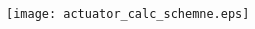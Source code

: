 \begin{frame}
\begin{columns}[T]
\begin{column}{0.48\textwidth}
			\begin{center}
				\texttt{[image: actuator\_calc\_schemne.eps]}
			\end{center}
		\end{column}
	\end{columns}



\end{frame}

